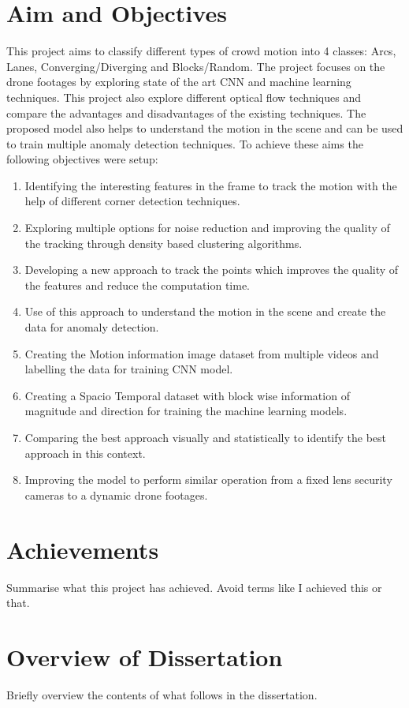 \section{Aim and Objectives} \label{sec:objectives}
This project aims to classify different types of crowd motion into 4 classes: Arcs, Lanes, Converging/Diverging and Blocks/Random. The project focuses on the drone footages by exploring state of the art CNN and machine learning techniques. 
This project also explore different optical flow techniques and compare the advantages and disadvantages of the existing techniques. The proposed model also helps to understand the motion in the scene and can be used to train multiple anomaly detection techniques. To achieve these aims the following objectives were setup:
\begin{enumerate}
	\item Identifying the interesting features in the frame to track the motion with the help of different corner detection techniques.
	\item Exploring multiple options for noise reduction and improving the quality of the tracking through density based clustering algorithms.
	\item Developing a new approach to track the points which improves the quality of the features and reduce the computation time.
	\item Use of this approach to understand the motion in the scene and create the data for anomaly detection.
	\item Creating the Motion information image dataset from multiple videos and labelling the data for training CNN model.
	\item Creating a Spacio Temporal dataset with block wise information of magnitude and direction for training the machine learning models.
	\item Comparing the best approach visually and statistically to identify the best approach in this context.
	\item Improving the model to perform similar operation from a fixed lens security cameras to a dynamic drone footages.
\end{enumerate}

\section{Achievements}
Summarise what this project has achieved. Avoid terms like I achieved this or 
that. 

\section{Overview of Dissertation}
Briefly overview the contents of what follows in the dissertation.